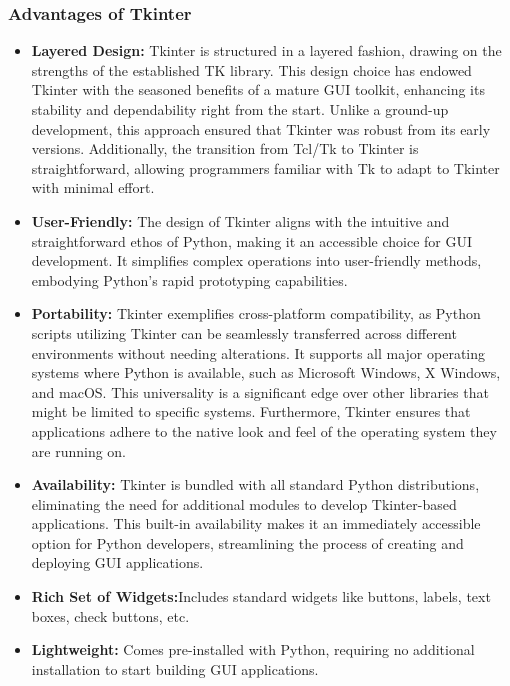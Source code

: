 \subsubsection{Advantages of Tkinter}

\begin{itemize}
    \item \textbf{Layered Design:}
    Tkinter is structured in a layered fashion, drawing on the strengths of the established TK library. This design choice has endowed Tkinter with the seasoned benefits of a mature GUI toolkit, enhancing its stability and dependability right from the start. Unlike a ground-up development, this approach ensured that Tkinter was robust from its early versions. Additionally, the transition from Tcl/Tk to Tkinter is straightforward, allowing programmers familiar with Tk to adapt to Tkinter with minimal effort.
    
    \item \textbf{User-Friendly:}
    The design of Tkinter aligns with the intuitive and straightforward ethos of Python, making it an accessible choice for GUI development. It simplifies complex operations into user-friendly methods, embodying Python's rapid prototyping capabilities.
    
    \item \textbf{Portability:}
    Tkinter exemplifies cross-platform compatibility, as Python scripts utilizing Tkinter can be seamlessly transferred across different environments without needing alterations. It supports all major operating systems where Python is available, such as Microsoft Windows, X Windows, and macOS. This universality is a significant edge over other libraries that might be limited to specific systems. Furthermore, Tkinter ensures that applications adhere to the native look and feel of the operating system they are running on.
    
    \item \textbf{Availability:}
    Tkinter is bundled with all standard Python distributions, eliminating the need for additional modules to develop Tkinter-based applications. This built-in availability makes it an immediately accessible option for Python developers, streamlining the process of creating and deploying GUI applications.
    
    \item \textbf{Rich Set of Widgets:}Includes standard widgets like buttons, labels, text boxes, check buttons, etc.
    
    \item \textbf{Lightweight:} Comes pre-installed with Python, requiring no additional installation to start building GUI applications.
\end{itemize}

